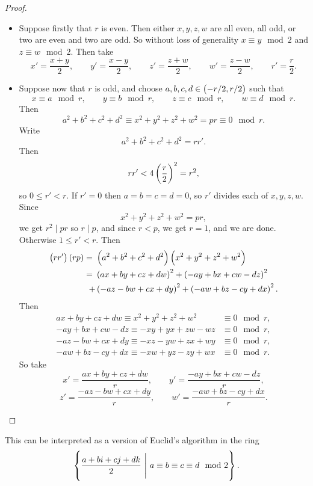 \begin{proof}
\hfill
\begin{itemize}
\item Suppose firstly that $ r $ is even. Then either $ x, y, z, w $ are all even, all odd, or two are even and two are odd. So without loss of generality $ x \equiv y \mod 2 $ and $ z \equiv w \mod 2 $. Then take
$$ x' = \dfrac{x + y}{2}, \qquad y' = \dfrac{x - y}{2}, \qquad z' = \dfrac{z + w}{2}, \qquad w' = \dfrac{z - w}{2}, \qquad r' = \dfrac{r}{2}. $$

\pagebreak

\item Suppose now that $ r $ is odd, and choose $ a, b, c, d \in \br{-r / 2, r / 2} $ such that
$$ x \equiv a \mod r, \qquad y \equiv b \mod r, \qquad z \equiv c \mod r, \qquad w \equiv d \mod r. $$
Then
$$ a^2 + b^2 + c^2 + d^2 \equiv x^2 + y^2 + z^2 + w^2 = pr \equiv 0 \mod r. $$
Write
$$ a^2 + b^2 + c^2 + d^2 = rr'. $$
Then
$$ rr' < 4\br{\dfrac{r}{2}}^2 = r^2, $$
so $ 0 \le r' < r $. If $ r' = 0 $ then $ a = b = c = d = 0 $, so $ r' $ divides each of $ x, y, z, w $. Since
$$ x^2 + y^2 + z^2 + w^2 = pr, $$
we get $ r^2 \mid pr $ so $ r \mid p $, and since $ r < p $, we get $ r = 1 $, and we are done. Otherwise $ 1 \le r' < r $. Then
\begin{align*}
\br{rr'}\br{rp}
= \ & \br{a^2 + b^2 + c^2 + d^2}\br{x^2 + y^2 + z^2 + w^2} \\
= \ & \br{ax + by + cz + dw}^2 + \br{-ay + bx + cw - dz}^2 \\
+ & \br{-az - bw + cx + dy}^2 + \br{-aw + bz - cy + dx}^2.
\end{align*}
Then
\begin{align*}
ax + by + cz + dw \equiv x^2 + y^2 + z^2 + w^2 & \equiv 0 \mod r, \\
-ay + bx + cw - dz \equiv -xy + yx + zw - wz & \equiv 0 \mod r, \\
-az - bw + cx + dy \equiv -xz - yw + zx + wy & \equiv 0 \mod r, \\
-aw + bz - cy + dx \equiv -xw + yz - zy + wx & \equiv 0 \mod r.
\end{align*}
So take
$$ x' = \dfrac{ax + by + cz + dw}{r}, \qquad y' = \dfrac{-ay + bx + cw - dz}{r}, $$
$$ z' = \dfrac{-az - bw + cx + dy}{r}, \qquad w' = \dfrac{-aw + bz - cy + dx}{r}. $$
\end{itemize}
\end{proof}

\begin{remark}
This can be interpreted as a version of Euclid's algorithm in the ring
$$ \cbr{\dfrac{a + bi + cj + dk}{2} \ \Bigg| \ a \equiv b \equiv c \equiv d \mod 2}. $$
\end{remark}

